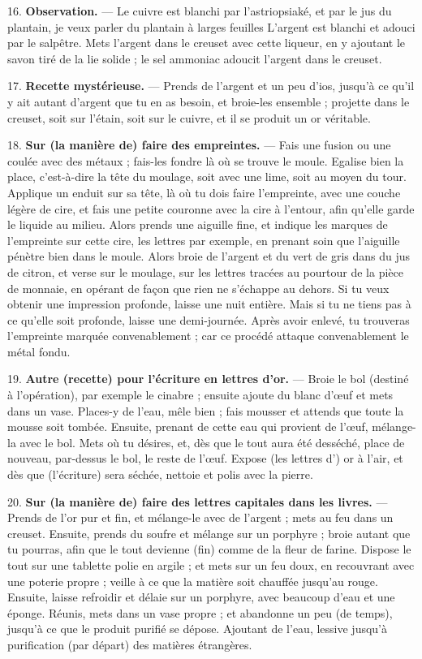 \documentclass[a4paper, 11pt, oneside, polutonikogreek, french]{article}
\begin{document}
16. \textbf{Observation.} --- Le cuivre est blanchi par l'astriopsiaké, et par le jus du plantain, je veux parler du plantain à larges feuilles L'argent est blanchi et adouci par le salpêtre. Mets l'argent dans le creuset avec cette liqueur, en y ajoutant le savon tiré de la lie solide ; le sel ammoniac adoucit l'argent dans le creuset.

17. \textbf{Recette mystérieuse.} --- Prends de l'argent et un peu d'ios, jusqu'à ce qu'il y ait autant d'argent que tu en as besoin, et broie-les ensemble ; projette dans le creuset, soit sur l'étain, soit sur le cuivre, et il se produit un or véritable.

18. \textbf{Sur (la manière de) faire des empreintes.} --- Fais une fusion ou une coulée avec des métaux ; fais-les fondre là où se trouve le moule. Egalise bien la place, c'est-à-dire la tête du moulage, soit avec une lime, soit au moyen du tour. Applique un enduit sur sa tête, là où tu dois faire l'empreinte, avec une couche légère de cire, et fais une petite couronne avec la cire à l'entour, afin qu'elle garde le liquide au milieu. Alors prends une aiguille fine, et indique les marques de l'empreinte sur cette cire, les lettres par exemple, en prenant soin que l'aiguille pénètre bien dans le moule. Alors broie de l'argent et du vert de gris dans du jus de citron, et verse sur le moulage, sur les lettres tracées au pourtour de la pièce de monnaie, en opérant de façon que rien ne s'échappe au dehors. Si tu veux obtenir une impression profonde, laisse une nuit entière. Mais si tu ne tiens pas à ce qu'elle soit profonde, laisse une demi-journée. Après avoir enlevé, tu trouveras l'empreinte marquée convenablement ; car ce procédé attaque convenablement le métal fondu.

19. \textbf{Autre (recette) pour l'écriture en lettres d'or.} --- Broie le bol (destiné à l'opération), par exemple le cinabre ; ensuite ajoute du blanc d'œuf et mets dans un vase. Places-y de l'eau, mêle bien ; fais mousser et attends que toute la mousse soit tombée. Ensuite, prenant de cette eau qui provient de l'œuf, mélange-la avec le bol. Mets où tu désires, et, dès que le tout aura été desséché, place de nouveau, par-dessus le bol, le reste de l'œuf. Expose (les lettres d') or à l'air, et dès que (l'écriture) sera séchée, nettoie et polis avec la pierre.

20. \textbf{Sur (la manière de) faire des lettres capitales dans les livres.} --- Prends de l'or pur et fin, et mélange-le avec de l'argent ; mets au feu dans un creuset. Ensuite, prends du soufre et mélange sur un porphyre ; broie autant que tu pourras, afin que le tout devienne (fin) comme de la fleur de farine. Dispose le tout sur une tablette polie en argile ; et mets sur un feu doux, en recouvrant avec une poterie propre ; veille à ce que la matière soit chauffée jusqu'au rouge. Ensuite, laisse refroidir et délaie sur un porphyre, avec beaucoup d'eau et une éponge. Réunis, mets dans un vase propre ; et abandonne un peu (de temps), jusqu'à ce que le produit purifié se dépose. Ajoutant de l'eau, lessive jusqu'à purification (par départ) des matières étrangères.
\end{document}
